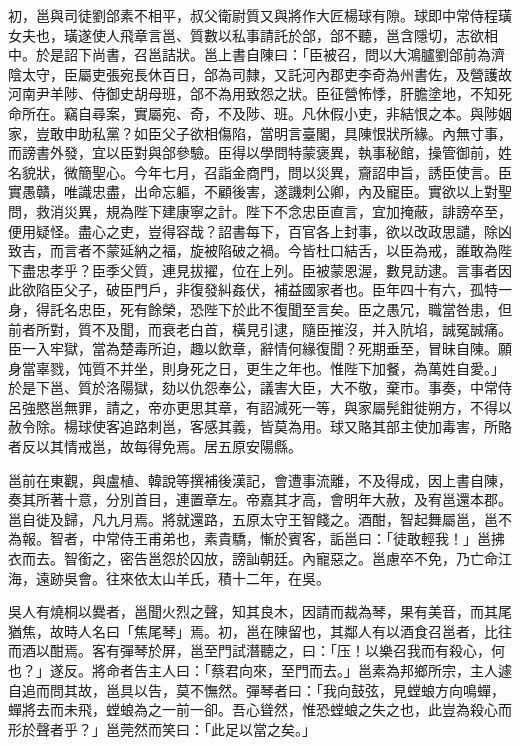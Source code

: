\begin{pinyinscope}
初，邕與司徒劉郃素不相平，叔父衛尉質又與將作大匠楊球有隙。球即中常侍程璜女夫也，璜遂使人飛章言邕、質數以私事請託於郃，郃不聽，邕含隱切，志欲相中。於是詔下尚書，召邕詰狀。邕上書自陳曰：「臣被召，問以大鴻臚劉郃前為濟陰太守，臣屬吏張宛長休百日，郃為司隸，又託河內郡吏李奇為州書佐，及營護故河南尹羊陟、侍御史胡母班，郃不為用致怨之狀。臣征營怖悸，肝膽塗地，不知死命所在。竊自尋案，實屬宛、奇，不及陟、班。凡休假小吏，非結恨之本。與陟姻家，豈敢申助私黨？如臣父子欲相傷陷，當明言臺閣，具陳恨狀所緣。內無寸事，而謗書外發，宜以臣對與郃參驗。臣得以學問特蒙褒異，執事秘館，操管御前，姓名貌狀，微簡聖心。今年七月，召詣金商門，問以災異，齎詔申旨，誘臣使言。臣實愚贛，唯識忠盡，出命忘軀，不顧後害，遂譏刺公卿，內及寵臣。實欲以上對聖問，救消災異，規為陛下建康寧之計。陛下不念忠臣直言，宜加掩蔽，誹謗卒至，便用疑怪。盡心之吏，豈得容哉？詔書每下，百官各上封事，欲以改政思譴，除凶致吉，而言者不蒙延納之福，旋被陷破之禍。今皆杜口結舌，以臣為戒，誰敢為陛下盡忠孝乎？臣季父質，連見拔擢，位在上列。臣被蒙恩渥，數見訪逮。言事者因此欲陷臣父子，破臣門戶，非復發糾姦伏，補益國家者也。臣年四十有六，孤特一身，得託名忠臣，死有餘榮，恐陛下於此不復聞至言矣。臣之愚冗，職當咎患，但前者所對，質不及聞，而衰老白首，橫見引逮，隨臣摧沒，并入阬埳，誠冤誠痛。臣一入牢獄，當為楚毒所迫，趣以飲章，辭情何緣復聞？死期垂至，冒昧自陳。願身當辜戮，饨質不并坐，則身死之日，更生之年也。惟陛下加餐，為萬姓自愛。」於是下邕、質於洛陽獄，劾以仇怨奉公，議害大臣，大不敬，棄市。事奏，中常侍呂強愍邕無罪，請之，帝亦更思其章，有詔減死一等，與家屬髡鉗徙朔方，不得以赦令除。楊球使客追路刺邕，客感其義，皆莫為用。球又賂其部主使加毒害，所賂者反以其情戒邕，故每得免焉。居五原安陽縣。

邕前在東觀，與盧植、韓說等撰補後漢記，會遭事流離，不及得成，因上書自陳，奏其所著十意，分別首目，連置章左。帝嘉其才高，會明年大赦，及宥邕還本郡。邕自徙及歸，凡九月焉。將就還路，五原太守王智餞之。酒酣，智起舞屬邕，邕不為報。智者，中常侍王甫弟也，素貴驕，慚於賓客，詬邕曰：「徒敢輕我！」邕拂衣而去。智銜之，密告邕怨於囚放，謗訕朝廷。內寵惡之。邕慮卒不免，乃亡命江海，遠跡吳會。往來依太山羊氏，積十二年，在吳。

吳人有燒桐以爨者，邕聞火烈之聲，知其良木，因請而裁為琴，果有美音，而其尾猶焦，故時人名曰「焦尾琴」焉。初，邕在陳留也，其鄰人有以酒食召邕者，比往而酒以酣焉。客有彈琴於屏，邕至門試潛聽之，曰：「压！以樂召我而有殺心，何也？」遂反。將命者告主人曰：「蔡君向來，至門而去。」邕素為邦鄉所宗，主人遽自追而問其故，邕具以告，莫不憮然。彈琴者曰：「我向鼓弦，見螳蜋方向鳴蟬，蟬將去而未飛，螳蜋為之一前一卻。吾心聳然，惟恐螳蜋之失之也，此豈為殺心而形於聲者乎？」邕莞然而笑曰：「此足以當之矣。」


\end{pinyinscope}
